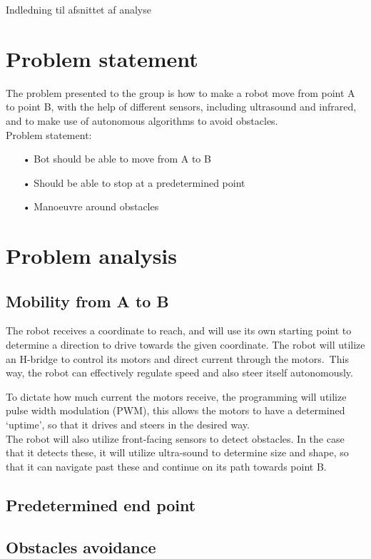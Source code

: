 Indledning til afsnittet af analyse\\

\section{Problem statement}

The problem presented to the group is how to make a robot move from point A to point B, with the help of different sensors, including ultrasound and infrared, and to make use of autonomous algorithms to avoid obstacles. \\

Problem statement:
\begin{enumerate}
\item[•]Bot should be able to move from A to B
\item[•]Should be able to stop at a predetermined point
\item[•]Manoeuvre around obstacles
\end{enumerate}

\section{Problem analysis}
\subsection{Mobility from A to B}
The robot receives a coordinate to reach, and will use its own starting point to determine a direction to drive towards the given coordinate. The robot will utilize an H-bridge to control its motors and direct current through the motors.\
This way, the robot can effectively regulate speed and also steer itself autonomously.\

To dictate how much current the motors receive, the programming will utilize pulse width modulation (PWM), this allows the motors to have a determined ‘uptime’, so that it drives and steers in the desired way.\\

The robot will also utilize front-facing sensors to detect obstacles. In the case that it detects these, it will utilize ultra-sound to determine size and shape, so that it can navigate past these and continue on its path towards point B.\

\subsection{Predetermined end point}
\subsection{Obstacles avoidance}